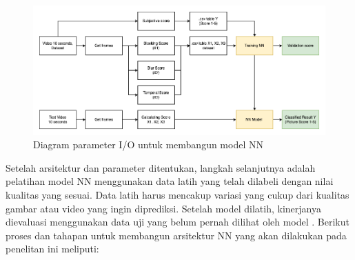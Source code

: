 \begin{figure}[H]
	\vspace{-0.1cm}
	\begin{center}
		\includegraphics[width=1\columnwidth]{bab3/Gambar/tahap-nn.png}
	\end{center}
	\vspace{-0.2cm}
	\caption{Diagram parameter I/O untuk membangun model NN} \label{tahap-nn}
\end{figure}
 
Setelah arsitektur dan parameter ditentukan, langkah selanjutnya adalah pelatihan model NN menggunakan data latih yang telah dilabeli dengan nilai kualitas yang sesuai. Data latih harus mencakup variasi yang cukup dari kualitas gambar atau video yang ingin diprediksi. Setelah model dilatih, kinerjanya dievaluasi menggunakan data uji yang belum pernah dilihat oleh model \citep{Otroshi_Shahreza_2019}. Berikut proses dan tahapan untuk membangun arsitektur NN yang akan dilakukan pada penelitan ini meliputi:

